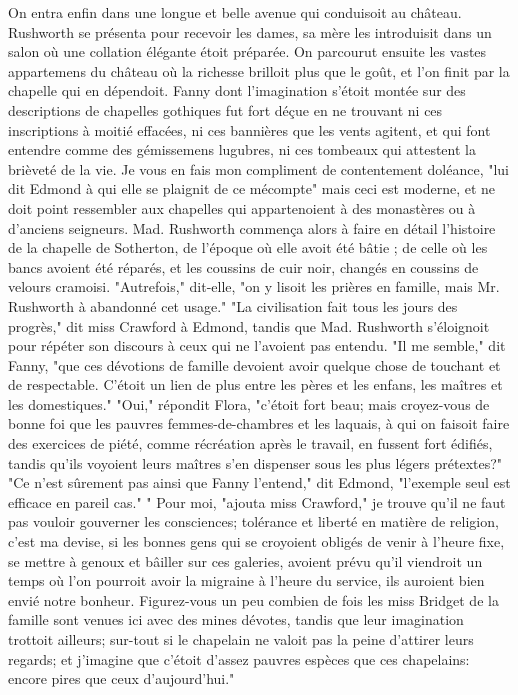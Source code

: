 On entra enfin dans une longue et belle avenue qui conduisoit au château. Rushworth se présenta pour recevoir les dames, sa mère les introduisit dans un salon où une collation élégante étoit préparée. On parcourut ensuite les vastes appartemens du château où la richesse brilloit plus que le goût, et l'on finit par la chapelle qui en dépendoit.
Fanny dont l'imagination s'étoit montée sur des descriptions de chapelles gothiques fut fort déçue en ne trouvant ni ces inscriptions à moitié effacées, ni ces bannières que les vents agitent, et qui font entendre comme des gémissemens lugubres, ni ces tombeaux qui attestent la brièveté de la vie.
Je vous en fais mon compliment de contentement\setcounter{page}{514} doléance, "lui dit Edmond à qui elle se plaignit de ce mécompte" mais ceci est moderne, et ne doit point ressembler aux chapelles qui appartenoient à des monastères ou à d’anciens seigneurs.
Mad. Rushworth commença alors à faire en détail l’histoire de la chapelle de Sotherton, de l’époque où elle avoit été bâtie ; de celle où les bancs avoient été réparés, et les coussins de cuir noir, changés en coussins de velours cramoisi. "Autrefois," dit-elle, "on y lisoit les prières en famille, mais Mr. Rushworth à abandonné cet usage."
"La civilisation fait tous les jours des progrès," dit miss Crawford à Edmond, tandis que Mad. Rushworth s’éloignoit pour répéter son discours à ceux qui ne l’avoient pas entendu.
"Il me semble," dit Fanny, "que ces dévotions de famille devoient avoir quelque chose de touchant et de respectable. C’étoit un lien de plus entre les pères et les enfans, les maîtres et les domestiques."
"Oui," répondit Flora, "c’étoit fort beau; mais croyez-vous de bonne foi que les pauvres femmes-de-chambres et les laquais, à qui on faisoit faire des exercices de piété, comme récréation après le travail, en fussent fort édifiés, tandis qu’ils voyoient leurs\setcounter{page}{515} maîtres s'en dispenser sous les plus légers prétextes?"
"Ce n'est sûrement pas ainsi que Fanny l'entend," dit Edmond, "l'exemple seul est efficace en pareil cas."
" Pour moi, "ajouta miss Crawford," je trouve qu'il ne faut pas vouloir gouverner les consciences; tolérance et liberté en matière de religion, c'est ma devise, si les bonnes gens qui se croyoient obligés de venir à l'heure fixe, se mettre à genoux et bâiller sur ces galeries, avoient prévu qu'il viendroit un temps où l'on pourroit avoir la migraine à l'heure du service, ils auroient bien envié notre bonheur. Figurez-vous un peu combien de fois les miss Bridget de la famille sont venues ici avec des mines dévotes, tandis que leur imagination trottoit ailleurs; sur-tout si le chapelain ne valoit pas la peine d'attirer leurs regards; et j'imagine que c'étoit d'assez pauvres espèces que ces chapelains: encore pires que ceux d'aujourd'hui."
